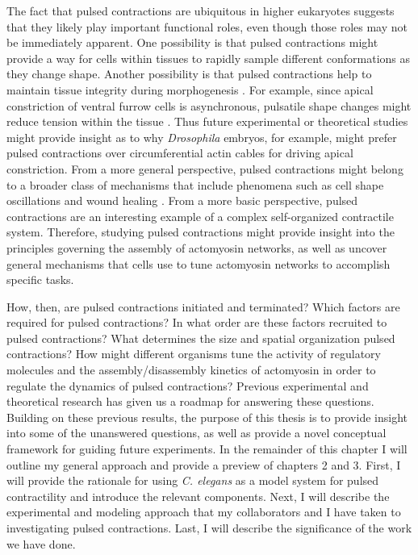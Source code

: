 \documentclass{ucetd}
\begin{document}
The fact that pulsed contractions are ubiquitous in higher eukaryotes suggests that they likely play important functional roles, even though those roles may not be immediately apparent.  One possibility is that pulsed contractions might provide a way for cells within tissues to rapidly sample different conformations as they change shape.  Another possibility is that pulsed contractions help to maintain tissue integrity during morphogenesis \cite{Vasquez:2014hv}.  For example, since apical constriction of ventral furrow cells is asynchronous, pulsatile shape changes might reduce tension within the tissue \cite{Martin:2009du, Vasquez:2014hv,Fischer:2014hm}.  Thus future experimental or theoretical studies might provide insight as to why \textit{Drosophila} embryos, for example, might prefer pulsed contractions over circumferential actin cables for driving apical constriction.  From a more general perspective, pulsed contractions might belong to a broader class of mechanisms that include phenomena such as cell shape oscillations and wound healing \cite{Gorfinkiel:2016bv,Razzell:2014eb}.  From a more basic perspective, pulsed contractions are an interesting example of a complex self-organized contractile system.  Therefore, studying pulsed contractions might provide insight into the principles governing the assembly of actomyosin networks, as well as uncover general mechanisms that cells use to tune actomyosin networks to accomplish specific tasks.


How, then, are pulsed contractions initiated and terminated?  Which factors are required for pulsed contractions?  In what order are these factors recruited to pulsed contractions?  What determines the size and spatial organization pulsed contractions?  How might different organisms tune the activity of regulatory molecules and the assembly/disassembly kinetics of actomyosin in order to regulate the dynamics of pulsed contractions?  Previous experimental and theoretical research has given us a roadmap for answering these questions.  Building on these previous results, the purpose of this thesis is to provide insight into some of the unanswered questions, as well as provide a novel conceptual framework for guiding future experiments.  In the remainder of this chapter I will outline my general approach and provide a preview of chapters 2 and 3.  First, I will provide the rationale for using \textit{C. elegans} as a model system for pulsed contractility and introduce the relevant components.  Next, I will describe the experimental and modeling approach that my collaborators and I have taken to investigating pulsed contractions.  Last, I will describe the significance of the work we have done.
\end{document}
